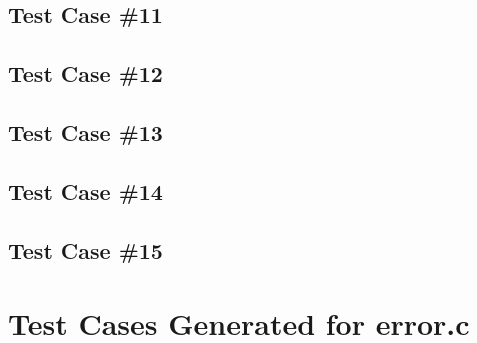 \subsection{Test Case \#11}


\subsection{Test Case \#12}


\subsection{Test Case \#13}


\subsection{Test Case \#14}


\subsection{Test Case \#15}



\newpage
\section{Test Cases Generated for error.c}


